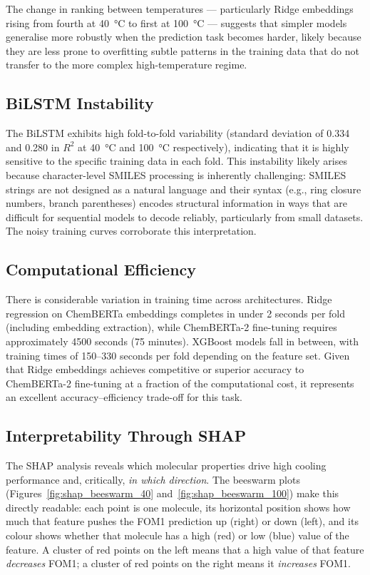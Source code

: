 \documentclass[11pt,a4paper]{article}
\begin{document}
The change in ranking between temperatures --- particularly Ridge embeddings rising from fourth at \SI{40}{\degreeCelsius} to first at \SI{100}{\degreeCelsius} --- suggests that simpler models generalise more robustly when the prediction task becomes harder, likely because they are less prone to overfitting subtle patterns in the training data that do not transfer to the more complex high-temperature regime.

\subsection{BiLSTM Instability}

The BiLSTM exhibits high fold-to-fold variability (standard deviation of 0.334 and 0.280 in $R^2$ at \SI{40}{\degreeCelsius} and \SI{100}{\degreeCelsius} respectively), indicating that it is highly sensitive to the specific training data in each fold. This instability likely arises because character-level SMILES processing is inherently challenging: SMILES strings are not designed as a natural language and their syntax (e.g., ring closure numbers, branch parentheses) encodes structural information in ways that are difficult for sequential models to decode reliably, particularly from small datasets. The noisy training curves corroborate this interpretation.

\subsection{Computational Efficiency}

There is considerable variation in training time across architectures. Ridge regression on ChemBERTa embeddings completes in under 2 seconds per fold (including embedding extraction), while ChemBERTa-2 fine-tuning requires approximately 4500 seconds (75 minutes). XGBoost models fall in between, with training times of 150--330 seconds per fold depending on the feature set. Given that Ridge embeddings achieves competitive or superior accuracy to ChemBERTa-2 fine-tuning at a fraction of the computational cost, it represents an excellent accuracy--efficiency trade-off for this task.

\subsection{Interpretability Through SHAP}
\label{sec:shap_discussion}

The SHAP analysis reveals which molecular properties drive high cooling performance and, critically, \emph{in which direction}. The beeswarm plots (Figures~\ref{fig:shap_beeswarm_40} and~\ref{fig:shap_beeswarm_100}) make this directly readable: each point is one molecule, its horizontal position shows how much that feature pushes the FOM1 prediction up (right) or down (left), and its colour shows whether that molecule has a high (red) or low (blue) value of the feature. A cluster of red points on the left means that a high value of that feature \emph{decreases} FOM1; a cluster of red points on the right means it \emph{increases} FOM1.
\end{document}
